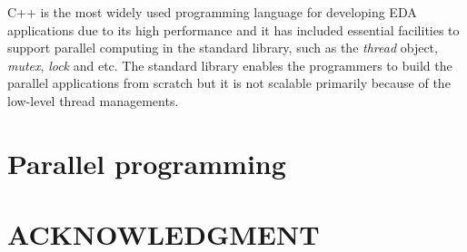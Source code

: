 \documentclass[sigconf]{acmart}
\begin{document}
C++ is the most widely used programming language for developing EDA
applications due to its high performance and it has included essential
facilities to support parallel computing in the standard library, such as the
\textit{thread} object, \textit{mutex}, \textit{lock} and etc.  The standard
library enables the programmers to build the parallel applications from scratch 
but it is not scalable primarily because of the low-level thread managements.





\section{Parallel programming}



\section{ACKNOWLEDGMENT}




%
%


\end{document}
